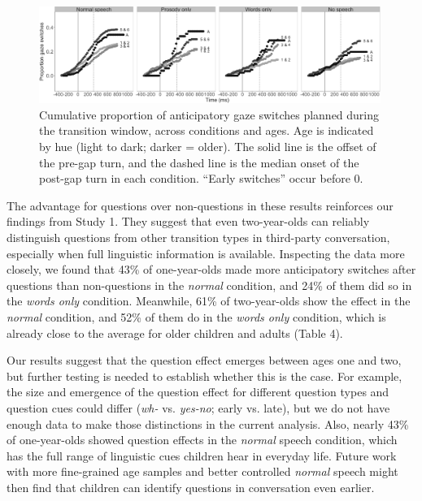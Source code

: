 \documentclass[authoryear, 12pt]{elsarticle}
\begin{document}
\begin{figure}[ht]
\begin{center}
\includegraphics[width=0.99\textwidth]{figures/FIG-cumulative-EN.png}
\end{center}
\caption{Cumulative proportion of anticipatory gaze switches planned during the transition window, across conditions and ages. Age is indicated by hue (light to dark; darker = older). The solid line is the offset of the pre-gap turn, and the dashed line is the median onset of the post-gap turn in each condition. ``Early switches'' occur before 0.} 
\label{cumulativeEN}
\end{figure}

The advantage for questions over non-questions in these results reinforces our findings from Study 1. They suggest that even two-year-olds can reliably distinguish questions from other transition types in third-party conversation, especially when full linguistic information is available. Inspecting the data more closely, we found that 43\% of one-year-olds made more anticipatory switches after questions than non-questions in the \textit{normal} condition, and 24\% of them did so in the \textit{words only} condition. Meanwhile, 61\% of two-year-olds show the effect in the \textit{normal} condition, and 52\% of them do in the \textit{words only} condition, which is already close to the average for older children and adults (Table 4).

Our results suggest that the question effect emerges between ages one and two, but further testing is needed to establish whether this is the case. For example, the size and emergence of the question effect for different question types and question cues could differ (\textit{wh-} vs. \textit{yes-no}; early vs. late), but we do not have enough data to make those distinctions in the current analysis. Also, nearly 43\% of one-year-olds showed question effects in the \textit{normal} speech condition, which has the full range of linguistic cues children hear in everyday life. Future work with more fine-grained age samples and better controlled \textit{normal} speech might then find that children can identify questions in conversation even earlier.
\end{document}
